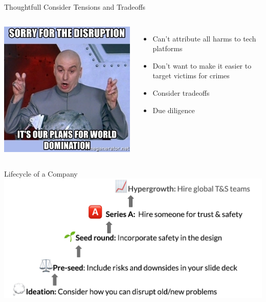 \documentclass[nobackground,dvipsnames,table,aspectratio=169]{beamer}
\begin{document}
\begin{frame}{Thoughtfull Consider Tensions and Tradeoffs}
    \begin{columns}
            \includegraphics[width=\textwidth]{disruption}
            \begin{itemize}
                \item Can’t attribute all harms to tech platforms
                \item Don’t want to make it easier to target victims for crimes
                \item Consider tradeoffs
                \item Due diligence
            \end{itemize}
    \end{columns}
\end{frame}

\begin{frame}{Lifecycle of a Company}
    \includegraphics[width=\textwidth]{company-lifecycle}
\end{frame}
\end{document}
